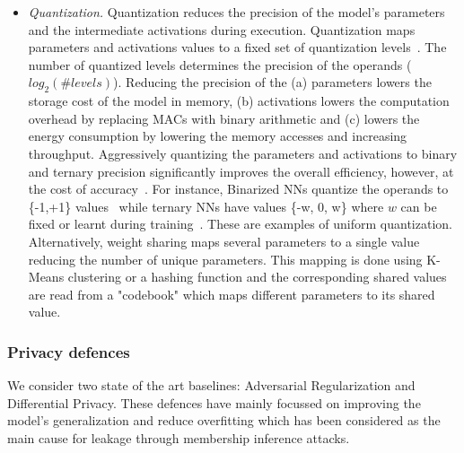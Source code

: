 \begin{itemize}[leftmargin=*]
\item {\em Quantization.}
Quantization reduces the precision of the model's parameters and the intermediate activations during execution.
Quantization maps parameters and activations values to a fixed set of quantization levels~\cite{Hubara:2017:QNN:3122009.3242044}.
The number of quantized levels determines the precision of the operands ($log_2(\#levels)$).
Reducing the precision of the (a) parameters lowers the storage cost of the model in memory, (b) activations lowers the computation overhead by replacing MACs with binary arithmetic and (c) lowers the energy consumption by lowering the memory accesses and increasing throughput.
Aggressively quantizing the parameters and activations to binary and ternary precision significantly improves the overall efficiency, however, at the cost of accuracy~\cite{rastegari2016xnornet}.
For instance, Binarized NNs quantize the operands to \{-1,+1\} values~\cite{NIPS2016_6573} while ternary NNs have values \{-w, 0, w\} where $w$ can be fixed or learnt during training~\cite{Li2016TernaryWN}. These are examples of uniform quantization.
Alternatively, weight sharing maps several parameters to a single value reducing the number of unique parameters.
This mapping is done using K-Means clustering or a hashing function and the corresponding shared values are read from a "codebook" which maps different parameters to its shared value.
\end{itemize}


\subsubsection{Privacy defences}


We consider two state of the art baselines: Adversarial Regularization and Differential Privacy.
These defences have mainly focussed on improving the model's generalization and reduce overfitting which has been considered as the main cause for leakage through membership inference attacks.

